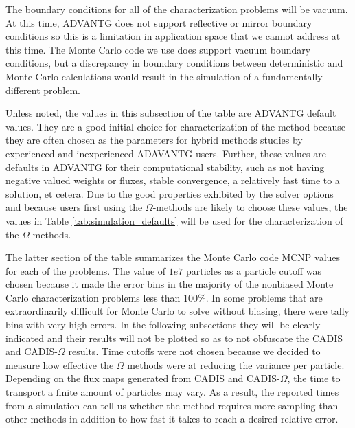 The boundary conditions for all of the characterization problems will be vacuum.
At this time, ADVANTG does not support reflective or mirror boundary conditions
so this is a limitation in application space that we cannot address at this
time. The Monte Carlo code we use does support vacuum boundary conditions, but a
discrepancy in boundary conditions between deterministic and Monte Carlo
calculations would result in the simulation of a fundamentally different problem.

Unless noted, the values in this subsection of the table are ADVANTG
default values. They are a good initial choice for characterization of the
method because they are often chosen as the parameters for hybrid methods studies
by experienced and inexperienced ADAVANTG users.
Further, these values are defaults in ADVANTG for their
computational stability, such as not having negative valued weights or fluxes,
stable convergence, a relatively fast time to a solution, et cetera. Due to
the good properties exhibited by the solver options and because users first
using the $\Omega$-methods are likely to choose these values, the values in
Table \ref{tab:simulation_defaults} will be used for the characterization of the
$\Omega$-methods.

The latter section of the table summarizes the Monte Carlo code MCNP values for
each of the problems. The value of $1e7$ particles as a particle cutoff
was chosen because it made the
error bins in the majority of the nonbiased Monte Carlo
characterization problems less than 100\%. In some problems that are
extraordinarily difficult for Monte Carlo to solve without biasing, there were
tally bins with very high errors. In the following subsections they will be
clearly indicated and their results will not be plotted so as to not obfuscate
the CADIS and CADIS-$\Omega$ results. Time cutoffs were not chosen because
we decided to measure how effective the $\Omega$ methods were at reducing the
variance per particle. Depending on the flux maps generated from CADIS and
CADIS-$\Omega$, the time to transport a finite amount of particles may vary. As
a result, the reported times from a simulation can tell us whether the method
requires more sampling than other methods in addition to how fast it takes to
reach a desired relative error.

